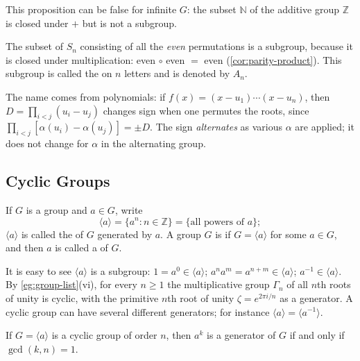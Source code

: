 \begin{remark}
	This proposition can be false for infinite \(G\): the subset \(\mathbb{N}\) of the
	additive group \(\mathbb{Z}\) is closed under \(+\) but is not a subgroup.
\end{remark}

\begin{eg}\label{eg:alternating}
	The subset of \(S_n\) consisting of all the \emph{even} permutations is a subgroup,
	because it is closed under multiplication: even \(\circ\) even \(=\) even
	(\autoref{cor:parity-product}). This subgroup is called the  on \(n\) letters and is denoted by \(A_n\).
\end{eg}

\begin{note}
	The name comes from polynomials: if
	\(f(x) = (x-u_1)\cdots(x-u_n)\), then \(D = \prod_{i<j}(u_i - u_j)\) changes sign when
	one permutes the roots, since \(\prod_{i<j}[\alpha(u_i) - \alpha(u_j)] = \pm D\). The
	sign \emph{alternates} as various \(\alpha\) are applied; it does not change for
	\(\alpha\) in the alternating group.
\end{note}

\subsection{Cyclic Groups}

\begin{definition}
	If \(G\) is a group and \(a \in G\), write
	\[
		\langle a \rangle = \{a^n : n \in \mathbb{Z}\} = \{\text{all powers of } a\};
	\]
	\(\langle a \rangle\) is called the  of \(G\) generated by
	\(a\). A group \(G\) is  if \(G = \langle a\rangle\) for some
	\(a \in G\), and then \(a\) is called a  of \(G\).
\end{definition}

It is easy to see \(\langle a\rangle\) is a subgroup: \(1 = a^0 \in \langle a\rangle\);
\(a^n a^m = a^{n+m} \in \langle a\rangle\); \(a^{-1} \in \langle a\rangle\). By
\autoref{eg:group-list}(vi), for every \(n \geq 1\) the multiplicative group
\(\Gamma_n\) of all \(n\)th roots of unity is cyclic, with the primitive \(n\)th root of
unity \(\zeta = e^{2\pi i/n}\) as a generator. A cyclic group can have several different
generators; for instance \(\langle a\rangle = \langle a^{-1}\rangle\).

\begin{proposition}\label{prop:cyclic-generators}
	If \(G = \langle a\rangle\) is a cyclic group of order \(n\), then \(a^k\) is a
	generator of \(G\) if and only if \(\gcd(k,n) = 1\).
\end{proposition}

